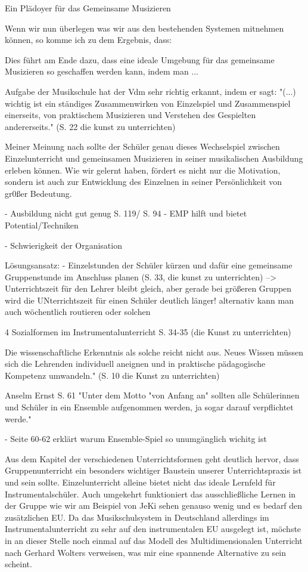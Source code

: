 Ein Plädoyer für das Gemeinsame Musizieren

Wenn wir nun überlegen was wir aus den bestehenden Systemen mitnehmen können, so
komme ich zu dem Ergebnis, dass: 

Dies führt am Ende dazu, dass eine ideale Umgebung für das gemeinsame Musizieren
so geschaffen werden kann, indem man ...

Aufgabe der Musikschule hat der Vdm sehr richtig erkannt, indem er sagt: "(...)
wichtig ist ein ständiges Zusammenwirken von Einzelspiel und Zusammenspiel
einerseits, von praktischem Musizieren und Verstehen des Gespielten
andererseits." (S. 22 die kunst zu unterrichten)

Meiner Meinung nach sollte der Schüler genau dieses Wechselspiel zwischen
Einzelunterricht und gemeinsamen Musizieren in seiner musikalischen Ausbildung
erleben können. Wie wir gelernt haben, fördert es nicht nur die Motivation,
sondern ist auch zur Entwicklung des Einzelnen in seiner Persönlichkeit von
gr0ßer Bedeutung. 


- Ausbildung nicht gut genug S. 119/ S. 94
- EMP hilft und bietet Potential/Techniken

- Schwierigkeit der Organisation

Lösungsansatz:
- Einzelstunden der Schüler kürzen und dafür eine gemeinsame Gruppenstunde im
Anschluss planen (S. 33, die kunst zu unterrichten)
--> Unterrichtszeit für den Lehrer bleibt gleich, aber gerade bei größeren
Gruppen wird die UNterrichtszeit für einen Schüler deutlich länger!
    alternativ kann man auch wöchentlich routieren oder solchen


4 Sozialformen im Instrumentalunterricht S. 34-35    (die Kunst zu unterrichten)

Die wissenschaftliche Erkenntnis als solche reicht nicht aus. Neues Wissen
müssen sich die Lehrenden individuell aneignen und in praktische pädagogische
Kompetenz umwandeln." (S. 10 die Kunst zu unterrichten)

Anselm Ernst S. 61 "Unter dem Motto "von Anfang an" sollten alle Schülerinnen und
Schüler in ein Ensemble aufgenommen werden, ja sogar darauf verpflichtet werde."

- Seite 60-62 erklärt warum Ensemble-Spiel so unumgänglich wichitg ist

Aus dem Kapitel der verschiedenen Unterrichtsformen geht deutlich hervor, dass
Gruppenunterricht ein besonders wichtiger Baustein unserer Unterrichtspraxis
ist und sein sollte. Einzelunterricht alleine bietet nicht das ideale Lernfeld
für Instrumentalschüler. Auch umgekehrt funktioniert das ausschließliche Lernen
in der Gruppe wie wir am Beispiel von JeKi sehen genauso wenig und es bedarf den
zusätzlichen EU. Da das Musikschulsystem in Deutschland allerdings im
Instrumentalunterricht zu sehr auf den instrumentalen EU ausgelegt ist, möchste
in an dieser Stelle noch einmal auf das Modell des Multidimensionalen Unterricht
nach Gerhard Wolters verweisen, was mir eine spannende Alternative zu sein
scheint. 
